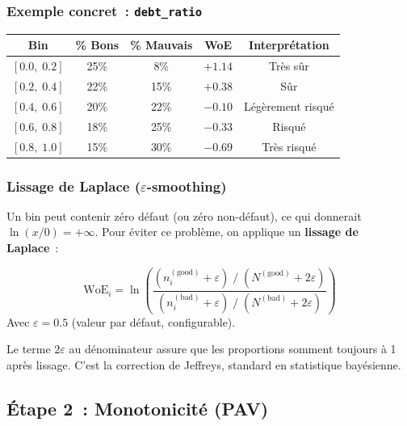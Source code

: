 \documentclass[12pt,a4paper]{article}
\begin{document}
\subsubsection{Exemple concret~: \texttt{debt\_ratio}}

\begin{center}
\begin{tabular}{ccccc}
\toprule
\textbf{Bin} & \textbf{\% Bons} & \textbf{\% Mauvais} & \textbf{WoE} & \textbf{Interpr\'etation} \\
\midrule
$[0.0,\; 0.2]$ & 25\% & 8\% & $+1.14$ & Tr\`es s\^ur \\
$[0.2,\; 0.4]$ & 22\% & 15\% & $+0.38$ & S\^ur \\
$[0.4,\; 0.6]$ & 20\% & 22\% & $-0.10$ & L\'eg\`erement risqu\'e \\
$[0.6,\; 0.8]$ & 18\% & 25\% & $-0.33$ & Risqu\'e \\
$[0.8,\; 1.0]$ & 15\% & 30\% & $-0.69$ & Tr\`es risqu\'e \\
\bottomrule
\end{tabular}
\end{center}

\subsubsection{Lissage de Laplace ($\varepsilon$-smoothing)}

Un bin peut contenir z\'ero d\'efaut (ou z\'ero non-d\'efaut), ce qui donnerait $\ln(x/0) = +\infty$. Pour \'eviter ce probl\`eme, on applique un \textbf{lissage de Laplace}~:

\begin{formulebox}
\begin{equation}
    \text{WoE}_i = \ln\left(
        \frac{(n_{i}^{(\text{good})} + \varepsilon)\;/\;(N^{(\text{good})} + 2\varepsilon)}
             {(n_{i}^{(\text{bad})} + \varepsilon)\;/\;(N^{(\text{bad})} + 2\varepsilon)}
    \right)
    \label{eq:woe_smooth}
\end{equation}
Avec $\varepsilon = 0.5$ (valeur par d\'efaut, configurable).
\end{formulebox}

Le terme $2\varepsilon$ au d\'enominateur assure que les proportions somment toujours \`a 1 apr\`es lissage. C'est la correction de Jeffreys, standard en statistique bay\'esienne.

\subsection{\'Etape 2~: Monotonicit\'e (PAV)}
\end{document}
